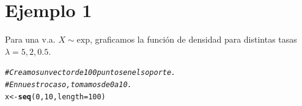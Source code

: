 \documentclass[10pt]{article}\usepackage[]{graphicx}\usepackage[]{xcolor}
\makeatletter
\newcommand{\hlnum}[1]{\textcolor[rgb]{0.686,0.059,0.569}{#1}}%
\newcommand{\hlcom}[1]{\textcolor[rgb]{0.678,0.584,0.686}{\textit{#1}}}%
\newcommand{\hlstd}[1]{\textcolor[rgb]{0.345,0.345,0.345}{#1}}%
\newcommand{\hlkwb}[1]{\textcolor[rgb]{0.69,0.353,0.396}{#1}}%
\newcommand{\hlkwc}[1]{\textcolor[rgb]{0.333,0.667,0.333}{#1}}%
\newcommand{\hlkwd}[1]{\textcolor[rgb]{0.737,0.353,0.396}{\textbf{#1}}}%
\newenvironment{kframe}{%
 \def\at@end@of@kframe{}%
 \ifinner\ifhmode%
  \def\at@end@of@kframe{\end{minipage}}%
  \begin{minipage}{\columnwidth}%
 \fi\fi%
 \def\FrameCommand##1{\hskip\@totalleftmargin \hskip-\fboxsep
 \colorbox{shadecolor}{##1}\hskip-\fboxsep
     \hskip-\linewidth \hskip-\@totalleftmargin \hskip\columnwidth}%
 \MakeFramed {\advance\hsize-\width
   \@totalleftmargin\z@ \linewidth\hsize
   \@setminipage}}%
 {\par\unskip\endMakeFramed%
 \at@end@of@kframe}
\newenvironment{knitrout}{}{} %
\makeatother
\begin{document}
\section{Ejemplo 1}

Para una v.a. $X\sim \mathrm{exp}$, graficamos la función de densidad para distintas tasas $\lambda = 5, 2, 0.5$.




\begin{knitrout}
\color{fgcolor}\begin{kframe}
\begin{alltt}
\hlcom{# Creamos un vector de 100 puntos en el soporte.}
\hlcom{# En nuestro caso, tomamos de 0 a 10.}
\hlstd{x} \hlkwb{<-} \hlkwd{seq}\hlstd{(}\hlnum{0}\hlstd{,} \hlnum{10}\hlstd{,} \hlkwc{length} \hlstd{=} \hlnum{100}\hlstd{)}
\end{alltt}
\end{kframe}
\end{knitrout}
\end{document}
